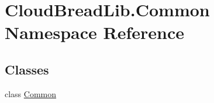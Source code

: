 \hypertarget{namespace_cloud_bread_lib_1_1_common}{}\section{Cloud\+Bread\+Lib.\+Common Namespace Reference}
\label{namespace_cloud_bread_lib_1_1_common}
\subsection*{Classes}
\begin{DoxyCompactItemize}
\item 
class \hyperlink{class_cloud_bread_lib_1_1_common_1_1_common}{Common}
\end{DoxyCompactItemize}
